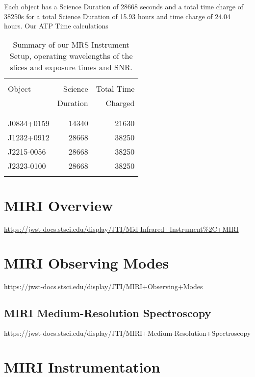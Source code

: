 Each object has a Science Duration of 28668 seconds and a total time charge of 38250s 
for a total Science Duration of  15.93 hours and time charge of 24.04 hours. 
Our ATP Time calculations
\begin{table}
\begin{center}
\begin{tabular}{|| l | r | r ||}
  \hline\hline
  && \\
  Object   	& 	Science           & Total Time          \\
         	        &      Duration        & Charged \\
  && \\
  \hline
  && \\
  J0834+0159  &       14340                & 21630   \\
  J1232+0912 &     28668         & 38250 \\
J2215-0056&      28668  &         38250 \\
J2323-0100 &      28668   &       38250 \\
  && \\
  \hline\hline
\end{tabular}
\caption{Summary of our MRS Instrument Setup, 
  operating wavelengths of the slices and exposure 
  times and SNR. 
}
\label{tab:ETC_calcs} 
\end{center}
\end{table}


\section{MIRI Overview}
\href{https://jwst-docs.stsci.edu/display/JTI/Mid-Infrared+Instrument\%2C+MIRI}{https://jwst-docs.stsci.edu/display/JTI/Mid-Infrared+Instrument\%2C+MIRI}

\section{MIRI Observing Modes}
https://jwst-docs.stsci.edu/display/JTI/MIRI+Observing+Modes
    \subsection{MIRI Medium-Resolution Spectroscopy}
    https://jwst-docs.stsci.edu/display/JTI/MIRI+Medium-Resolution+Spectroscopy

\section{MIRI Instrumentation}
